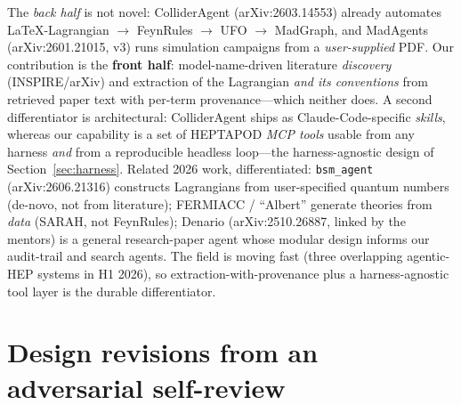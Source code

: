 \documentclass[11pt]{article}
\newcommand{\code}[1]{\texttt{#1}}
\newcommand{\arw}{$\rightarrow$}
\begin{document}
The \emph{back half} is not novel: ColliderAgent (arXiv:2603.14553) already
automates LaTeX-Lagrangian \arw{} FeynRules \arw{} UFO \arw{} MadGraph, and
MadAgents (arXiv:2601.21015, v3) runs simulation campaigns from a
\emph{user-supplied} PDF. Our contribution is the \textbf{front half}:
model-name-driven literature \emph{discovery} (INSPIRE/arXiv) and extraction of
the Lagrangian \emph{and its conventions} from retrieved paper text with per-term
provenance---which neither does. A second differentiator is architectural:
ColliderAgent ships as Claude-Code-specific \emph{skills}, whereas our capability
is a set of HEPTAPOD \emph{MCP tools} usable from any harness \emph{and} from a
reproducible headless loop---the harness-agnostic design of
Section~\ref{sec:harness}. Related 2026 work, differentiated: \code{bsm\_agent}
(arXiv:2606.21316) constructs Lagrangians from user-specified quantum numbers
(de-novo, not from literature); FERMIACC / ``Albert'' generate theories from
\emph{data} (SARAH, not FeynRules); Denario (arXiv:2510.26887, linked by the
mentors) is a general research-paper agent whose modular design informs our
audit-trail and search agents. The field is moving fast (three overlapping
agentic-HEP systems in H1 2026), so extraction-with-provenance plus a
harness-agnostic tool layer is the durable differentiator.

\section{Design revisions from an adversarial self-review}
\label{sec:doability}
\end{document}
